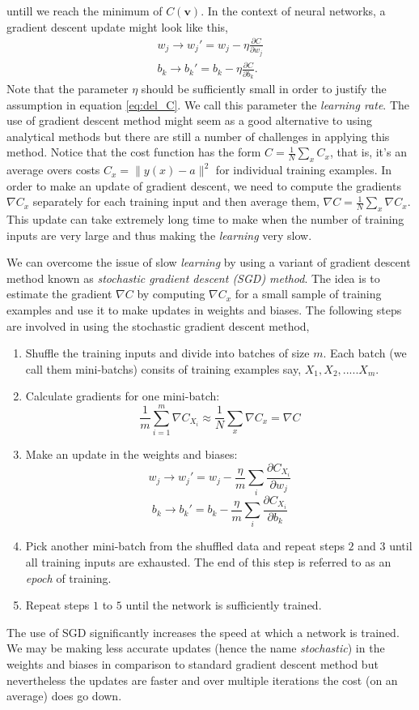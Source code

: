 untill we reach the minimum of $C(\mathbf{v})$. In the context of neural networks, a gradient descent update might look like this, 
\begin{equation}
    \begin{aligned}
        w_j \rightarrow w_j' = w_j - \eta \frac{\partial C}{\partial w_j}\\
        b_k \rightarrow b_k' = b_k - \eta \frac{\partial C}{\partial b_k}.
    \end{aligned}
\end{equation}
Note that the parameter $\eta$ should be sufficiently small in order to justify the assumption in equation \eqref{eq:del_C}. 
We call this parameter the \emph{learning rate}. The use of gradient descent method might seem as a
good alternative to using analytical methods but there are still a number of challenges in applying this method. Notice that the cost function has the form
$C = \frac{1}{N} \sum_x C_x$, that is, it's an average overs costs $C_x = \|y(x) - a\|^2$ for individual training examples. In order to make an update of gradient
descent, we need to compute the gradients $\nabla C_x$ separately for each training input and then average them, $\nabla C = \frac{1}{N} \sum_x \nabla C_x$. This update can take 
extremely long time to make when the number of training inputs are very large and thus making the \emph{learning} very slow. 

We can overcome the issue of slow \emph{learning} by using a variant of gradient descent method known as \emph{stochastic gradient descent (SGD) method}. The idea is to estimate the gradient
$\nabla C$ by computing $\nabla C_x$ for a small sample of training examples and use it to make updates in weights and biases. The following steps are involved in using the stochastic gradient descent method,
\begin{enumerate}
    \item Shuffle the training inputs and divide into batches of size $m$. Each batch (we call them mini-batchs) consits of training examples say, $X_1, X_2, .....X_m$.
    \item Calculate gradients for one mini-batch: $$\frac{1}{m} \sum_{i=1}^{m} \nabla C_{X_i} \approx \frac{1}{N} \sum_x \nabla C_x = \nabla C$$
    \item Make an update in the weights and biases: 
    $$w_j \rightarrow w_j' = w_j - \frac{\eta}{m} \sum_i \frac{\partial C_{X_i}}{\partial w_j}$$
    $$b_k \rightarrow b_k' = b_k - \frac{\eta}{m} \sum_i \frac{\partial C_{X_i}}{\partial b_k}$$
    \item Pick another mini-batch from the shuffled data and repeat steps $2$ and $3$ until all training inputs are exhausted. The end of this step is referred to as an \emph{epoch} of training.
    \item Repeat steps $1$ to $5$ until the network is sufficiently trained.
\end{enumerate}
The use of SGD significantly increases the speed at which a network is trained. We may be making less accurate updates (hence the name \emph{stochastic}) in the weights and biases in comparison to 
standard gradient descent method but nevertheless the updates are faster and over multiple iterations the cost (on an average) does go down. 
